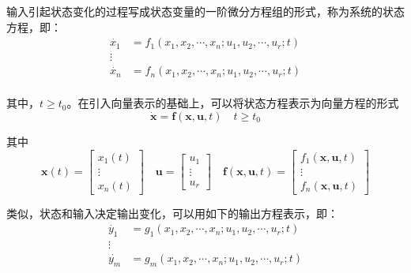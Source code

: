 \begin{definition}[状态方程与输出方程]
    输入引起状态变化的过程写成状态变量的一阶微分方程组的形式，称为系统的状态方程，即：
    \begin{equation*}
        \begin{split}
            \dot{x_1} &= f_1(x_1,x_2,\cdots,x_n;u_1,u_2,\cdots,u_r;t) \\
            \vdots & \\
            \dot{x_n} &= f_n(x_1,x_2,\cdots,x_n;u_1,u_2,\cdots,u_r;t) \\
        \end{split}
    \end{equation*}

    其中，$t\geq t_0$。在引入向量表示的基础上，可以将状态方程表示为向量方程的形式
    \begin{equation*}
        \dot{\bm{x}} = \bm{f}(\bm{x},\bm{u},t) \quad t \geq t_0
    \end{equation*}

    其中
    \begin{equation*}
        \bm{x}(t) = \left[
            \begin{array}{c}
                x_1(t) \\ \vdots \\ x_n(t) 
            \end{array}
        \right]
        \quad
        \bm{u} = \left[
            \begin{array}{c}
                u_1 \\ \vdots \\ u_r
            \end{array}
        \right]
        \quad 
        \bm{f}(\bm{x},\bm{u},t) = \left[
            \begin{array}{c}
                f_1(\bm{x},\bm{u},t) \\ \vdots \\ f_n(\bm{x},\bm{u},t)
            \end{array}
        \right]
    \end{equation*}

    类似，状态和输入决定输出变化，可以用如下的输出方程表示，即：
        \begin{equation*}
        \begin{split}
            \dot{y_1} &= g_1(x_1,x_2,\cdots,x_n;u_1,u_2,\cdots,u_r;t) \\
            \vdots & \\
            \dot{y_m} &= g_m(x_1,x_2,\cdots,x_n;u_1,u_2,\cdots,u_r;t) \\
        \end{split}
    \end{equation*}


\end{definition}
